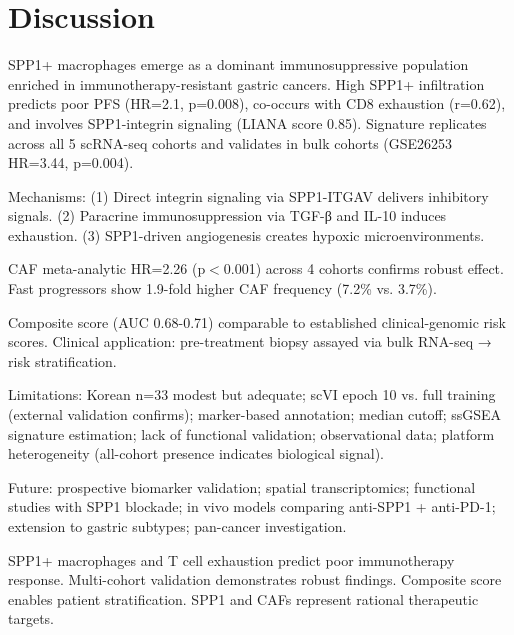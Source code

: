 \documentclass[12pt,twoside]{article}
\begin{document}
\section{Discussion}

SPP1+ macrophages emerge as a dominant immunosuppressive population enriched in immunotherapy-resistant gastric cancers. High SPP1+ infiltration predicts poor PFS (HR=2.1, p=0.008), co-occurs with CD8 exhaustion (r=0.62), and involves SPP1-integrin signaling (LIANA score 0.85). Signature replicates across all 5 scRNA-seq cohorts and validates in bulk cohorts (GSE26253 HR=3.44, p=0.004).

Mechanisms: (1) Direct integrin signaling via SPP1-ITGAV delivers inhibitory signals. (2) Paracrine immunosuppression via TGF-β and IL-10 induces exhaustion. (3) SPP1-driven angiogenesis creates hypoxic microenvironments.

CAF meta-analytic HR=2.26 (p$<$0.001) across 4 cohorts confirms robust effect. Fast progressors show 1.9-fold higher CAF frequency (7.2\% vs. 3.7\%).

Composite score (AUC 0.68-0.71) comparable to established clinical-genomic risk scores. Clinical application: pre-treatment biopsy assayed via bulk RNA-seq → risk stratification.

Limitations: Korean n=33 modest but adequate; scVI epoch 10 vs. full training (external validation confirms); marker-based annotation; median cutoff; ssGSEA signature estimation; lack of functional validation; observational data; platform heterogeneity (all-cohort presence indicates biological signal).

Future: prospective biomarker validation; spatial transcriptomics; functional studies with SPP1 blockade; in vivo models comparing anti-SPP1 + anti-PD-1; extension to gastric subtypes; pan-cancer investigation.

SPP1+ macrophages and T cell exhaustion predict poor immunotherapy response. Multi-cohort validation demonstrates robust findings. Composite score enables patient stratification. SPP1 and CAFs represent rational therapeutic targets.

\clearpage
\end{document}
